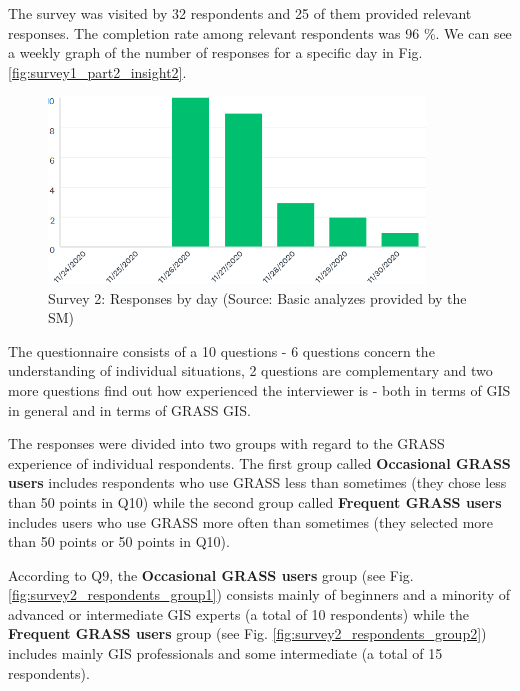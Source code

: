 \documentclass[a4paper,10pt,twoside]{article}
\begin{document}
\noindent The survey was visited by 32 respondents and 25 of them provided relevant responses. The completion rate among relevant respondents was 96 \%. We can see a weekly graph  of the number of responses for a specific day in Fig. \ref{fig:survey1_part2_insight2}.

\vspace{0.3cm}
\begin{figure}[hbt!] 
\begin{center}
\includegraphics[width=10cm]{../surveys/analyzed_data/survey2_insight2.png} 
\caption[Survey 2: Responses by day]{Survey 2: Responses by day (Source: Basic analyzes provided by the SM)}
\label{fig:survey2_insight2}
\end{center}
\end{figure}

\noindent The questionnaire consists of a 10 questions - 6 questions concern the understanding of individual situations, 2 questions are complementary and two more questions find out how experienced the interviewer is - both in terms of GIS in general and in terms of GRASS GIS. 

The responses were divided into two groups with regard to the GRASS experience of individual respondents. The first group called \textbf{Occasional GRASS users} includes respondents who use GRASS less than sometimes (they chose less than 50 points in Q10) while the second group called \textbf{Frequent GRASS users} includes users who use GRASS more often than sometimes (they selected more than 50 points or 50 points in Q10). 

According to Q9, the \textbf{Occasional GRASS users} group (see Fig. \ref{fig:survey2_respondents_group1}) consists mainly of beginners and a minority of advanced or intermediate GIS experts (a total of 10 respondents) while the \textbf{Frequent GRASS users} group (see Fig. \ref{fig:survey2_respondents_group2}) includes mainly GIS professionals and some intermediate (a total of 15 respondents).
\end{document}
